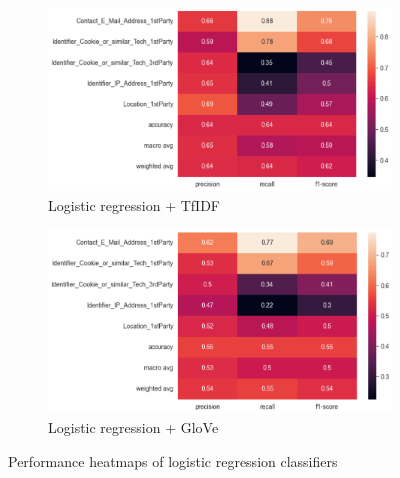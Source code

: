 \begin{figure}[!ht]
	\begin{subfigure}[b]{1\textwidth}
	  \centering
	  \includegraphics[width=\linewidth]{figures/heatmap_log_tfidf.png}
	  \caption{Logistic regression + TfIDF}
	\end{subfigure}
	\hfill
	\begin{subfigure}[b]{1\textwidth}
	  \centering
	  \includegraphics[width=\linewidth]{figures/heatmap_log_glove.png}
	  \caption{Logistic regression + GloVe}
	\end{subfigure}
	\caption{Performance heatmaps of logistic regression classifiers}
	\label{fig:heatmaps_perf_lr}
\end{figure}
	
